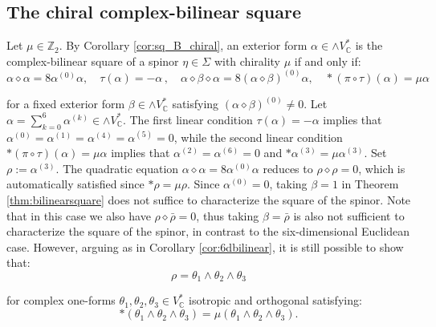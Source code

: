\documentclass[10pt,a4paper,twoside,reqno]{amsart}
\theoremstyle{plain}
\theoremstyle{definition}
\theoremstyle{remark}
\def\C{\mathbb{C}}
\begin{document}

\subsection{The chiral complex-bilinear square}


Let $\mu\in\mathbb{Z}_2$. By Corollary \ref{cor:sq_B_chiral}, an exterior form $\alpha\in\wedge V^*_\C$ is the complex-bilinear square of a spinor $\eta\in\Sigma$ with chirality $\mu$ if and only if:
\begin{equation*}
\alpha\diamond\alpha=8\alpha^{(0)}\alpha,\quad\tau(\alpha) =-\alpha\, , \quad \alpha \diamond \beta \diamond \alpha = 8 (\alpha\diamond\beta)^{(0)} \alpha,\quad *(\pi\circ\tau)(\alpha)=\mu\alpha  
\end{equation*}

\noindent
for a fixed exterior form $\beta\in\wedge V^*_\C$ satisfying $(\alpha\diamond\beta)^{(0)}\neq0$. Let $\alpha=\sum_{k=0}^6\alpha^{(k)}\in\wedge V^*_\C$. The first linear condition $\tau(\alpha)=-\alpha$ implies that $\alpha^{(0)}=\alpha^{(1)}=\alpha^{(4)}=\alpha^{(5)}=0$, while the second linear condition $*(\pi\circ\tau)(\alpha)=\mu\alpha$ implies that $\alpha^{(2)}=\alpha^{(6)}=0$ and $*\alpha^{(3)}=\mu\alpha^{(3)}$. Set $\rho:=\alpha^{(3)}$. The quadratic equation $\alpha\diamond\alpha=8\alpha^{(0)}\alpha$ reduces to $\rho\diamond\rho=0$, which is automatically satisfied since $\ast\rho = \mu \rho$. Since $\alpha^{(0)}=0$, taking $\beta=1$ in Theorem \ref{thm:bilinearsquare} does not suffice to characterize the square of the spinor. Note that in this case we also have $\rho\diamond\bar\rho=0$, thus taking $\beta=\bar\rho$ is also not sufficient to characterize the square of the spinor, in contrast to the six-dimensional Euclidean case. However, arguing as in Corollary \ref{cor:6dbilinear}, it is still possible to show that:
\begin{equation*}
\rho=\theta_1\wedge\theta_2\wedge\theta_3
\end{equation*}

\noindent
for complex one-forms $\theta_1,\theta_2,\theta_3\in V^*_\C$ isotropic and orthogonal satisfying: 
\begin{equation*}
*(\theta_1\wedge\theta_2\wedge\theta_3)=\mu(\theta_1\wedge\theta_2\wedge\theta_3).
\end{equation*}
\end{document}
